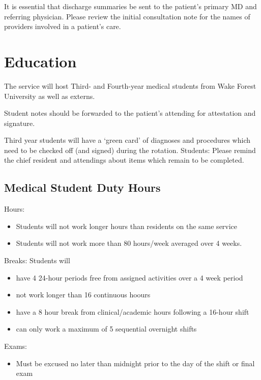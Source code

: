 \documentclass[
]{book}
\providecommand{\tightlist}{%
  \setlength{\itemsep}{0pt}\setlength{\parskip}{0pt}}
\begin{document}
It is essential that discharge summaries be sent to the patient's primary MD and referring physician. Please review the initial consultation note for the names of providers involved in a patient's care.

\hypertarget{education}{%
\chapter{Education}\label{education}}

The service will host Third- and Fourth-year medical students from Wake Forest University as well as externs.

Student notes should be forwarded to the patient's attending for attestation and signature.

Third year students will have a `green card' of diagnoses and procedures which need to be checked off (and signed) during the rotation. Students: Please remind the chief resident and attendings about items which remain to be completed.

\hypertarget{medical-student-duty-hours}{%
\section{Medical Student Duty Hours}\label{medical-student-duty-hours}}

Hours:

\begin{itemize}
\tightlist
\item
  Students will not work longer hours than residents on the same service
\item
  Students will not work more than 80 hours/week averaged over 4 weeks.
\end{itemize}

Breaks: Students will

\begin{itemize}
\tightlist
\item
  have 4 24-hour periods free from assigned activities over a 4 week period
\item
  not work longer than 16 continuous hoours
\item
  have a 8 hour break from clinical/academic hours following a 16-hour shift
\item
  can only work a maximum of 5 sequential overnight shifts
\end{itemize}

Exams:

\begin{itemize}
\tightlist
\item
  Must be excused no later than midnight prior to the day of the shift or final exam
\end{itemize}
\end{document}

